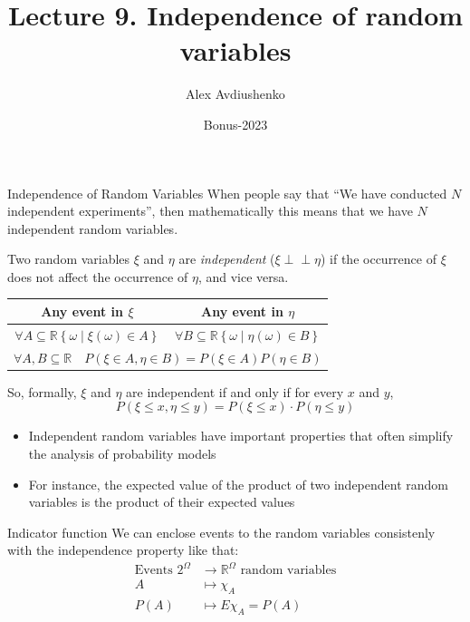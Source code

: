 \documentclass[fullscreen=true, bookmarks=true, hyperref={pdfencoding=unicode}]{beamer}
\title{Lecture 9. Independence of random variables}
\author{Alex Avdiushenko}
\institute{Neapolis University Paphos}
\date{Bonus-2023}
\newcommand{\indep}{\perp \!\!\! \perp}
\begin{document}
\begin{frame}
\transdissolve[duration=0.2]
\titlepage
\end{frame}


\begin{frame}{Independence of Random Variables}
  When people say that ``We have conducted $N$ independent experiments'', 
  then mathematically this means that we have $N$ independent random variables.

  \pause
  \begin{definition}
    Two random variables $\xi$ and $\eta$ are \emph{independent} ($\xi \indep \eta$) if 
    the occurrence of $\xi$ does not affect the occurrence of $\eta$, 
    and vice versa.
  \end{definition}
  
  \centering
  \begin{tabular}{|c|c|}
    \hline
      Any event in $\xi$ & Any event in $\eta$ \\
      \hline
      $\forall A \subseteq \mathbb{R} \left\{\omega\mid \xi(\omega) \in A\right\}$ &
      $\forall B \subseteq \mathbb{R} \left\{\omega\mid \eta(\omega) \in B\right\}$ \\
      \hline\hline
      \multicolumn{2}{|c|}{  
        $\forall A, B \subseteq \mathbb{R} \quad 
        P(\xi \in A, \eta \in B) = P(\xi \in A) P(\eta \in B)$
      } \\
      \hline
  \end{tabular}
\end{frame}


\begin{frame}
  \begin{block}{So, formally,}
    $\xi$ and $\eta$ are independent if and only if for every $x$ and $y$, 
    \[P(\xi \leq x, \eta \leq y) = P(\xi \leq x) \cdot P(\eta \leq y)\]
  \end{block}
    
  \begin{itemize}
    \pause\item Independent random variables have important properties 
    that often simplify the analysis of probability models
    \pause\item For instance, the expected value of the product of 
    two independent random variables is the product of their expected values
  \end{itemize}

  \pause
  \begin{block}{Indicator function}
    We can enclose events to the random variables consistenly with the independence property like that:
    \begin{align*}
      \text{Events } 2^\Omega &\to \mathbb{R}^\Omega \text{ random variables} \\
      A &\mapsto \chi_A \\
      P(A) &\mapsto E \chi_A = P(A)
    \end{align*}
  \end{block}
\end{frame}
\end{document}
